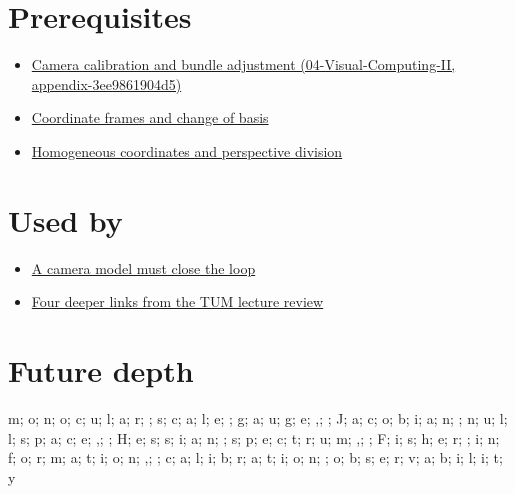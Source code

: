 \section{Prerequisites}\label{appendix-113f0267e5f4-prerequisites}

\begin{itemize}
\tightlist
\item
  \href{../04-Visual-Computing-II/main.pdf\#nameddest=appendix-3ee9861904d5}{Camera calibration and bundle adjustment (04-Visual-Computing-II, appendix-3ee9861904d5)}
\item
  \hyperref[appendix-1bae9457dbc3]{Coordinate frames and change of basis}
\item
  \hyperref[appendix-cb3b26862282]{Homogeneous coordinates and perspective division}
\end{itemize}

\section{Used by}\label{appendix-113f0267e5f4-used-by}

\begin{itemize}
\tightlist
\item
  \href{Continuous\%20Notes/Computing\%20Foundations\%20-\%20From\%20Bits\%20to\%20C++\%20and\%20Systems\%20APIs\#A\%20camera\%20model\%20must\%20close\%20the\%20loop}{A camera model must close the loop}
\item
  \href{Continuous\%20Notes/Computing\%20Foundations\%20-\%20From\%20Bits\%20to\%20C++\%20and\%20Systems\%20APIs\#Four\%20deeper\%20links\%20from\%20the\%20TUM\%20lecture\%20review}{Four deeper links from the TUM lecture review}
\end{itemize}

\section{Future depth}\label{appendix-113f0267e5f4-future-depth}

m; o; n; o; c; u; l; a; r; ; s; c; a; l; e; ; g; a; u; g; e; ,; ; J; a; c; o; b; i; a; n; ; n; u; l; l; s; p; a; c; e; ,; ; H; e; s; s; i; a; n; ; s; p; e; c; t; r; u; m; ,; ; F; i; s; h; e; r; ; i; n; f; o; r; m; a; t; i; o; n; ,; ; c; a; l; i; b; r; a; t; i; o; n; ; o; b; s; e; r; v; a; b; i; l; i; t; y
